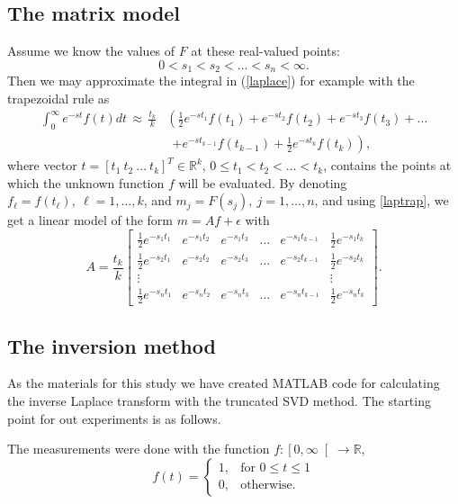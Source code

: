 \documentclass[12pt,a4]{article}
\newcommand{\R}{{\mathbb R}}
\newcommand{\ra}{\rightarrow}
\begin{document}
\subsection{The matrix model}\label{sec:matrixmodel}

Assume we know the values of $F$ at these real-valued points:
$$
 0<s_1<s_2<\ldots <s_n<\infty.
$$ 
Then we may approximate the integral in (\ref{laplace}) for example with the trapezoidal rule as
\begin{equation} \label{laptrap}
\begin{split}
 \int_0^\infty e^{-st}f(t)dt\, \approx\, \frac{t_k}{k} & \left( \frac{1}{2}e^{-st_1}f(t_1)+e^{-st_2}f(t_2)+e^{-st_3}f(t_3)+\ldots\right.\\   &\ \ \left. +e^{-st_{k-1}}f(t_{k-1})+\frac{1}{2}e^{-st_k}f(t_k)\right) ,
\end{split}
\end{equation}
where vector $t=[t_1\ t_2\ \ldots\ t_k]^T\in\R^k$, $0\leq t_1<t_2<\ldots <t_k$, contains the points at which the unknown function $f$ will be evaluated. By denoting $f_\ell=f(t_\ell), \ \ell=1,\ldots ,k$, and $m_j=F(s_j),\ j=1,\ldots ,n$, and using \eqref{laptrap}, we get a linear model of the form $m=Af+\epsilon$ with
\begin{equation}\label{LaplaceA} 
A = \frac{t_k}{k}\begin{bmatrix} \frac{1}{2}e^{-s_1t_1} & e^{-s_1t_2} & e^{-s_1t_3} & \ldots & e^{-s_1t_{k-1}} & \frac{1}{2}e^{-s_1t_k} \\
                       \frac{1}{2}e^{-s_2t_1} & e^{-s_2t_2} & e^{-s_2t_3} & \ldots & e^{-s_2t_{k-1}} & \frac{1}{2}e^{-s_2t_k} \\
                       \vdots & & & & & \vdots \\
                       \frac{1}{2}e^{-s_nt_1} & e^{-s_nt_2} & e^{-s_nt_3} & \ldots & e^{-s_nt_{k-1}} & \frac{1}{2}e^{-s_nt_k} \end{bmatrix}.
\end{equation}


\subsection{The inversion method}

As the materials for this study we have created MATLAB code for calculating the inverse Laplace transform with the truncated SVD method. The starting point for out experiments is as follows.

The measurements were done with the function $f: \left[ 0, \infty \right[ \ra \R$,
\begin{equation}\label{eq:f}
f(t) = 
\begin{cases}
1, & \text{for } 0 \leq t \leq 1 \\
0, & \text{otherwise}.
\end{cases}
\end{equation}
\end{document}
